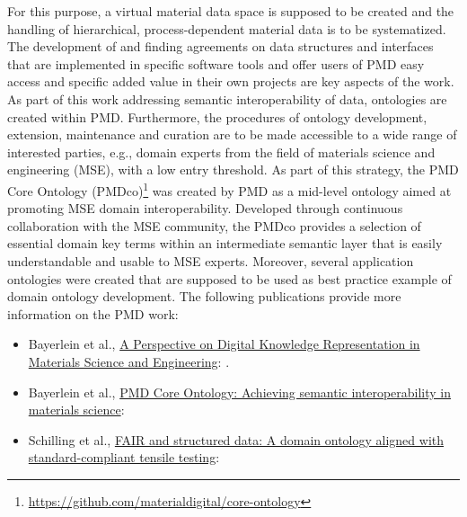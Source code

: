 For this purpose, a virtual material data space is supposed to be created and the handling of hierarchical, process-dependent material data is to be systematized. The development of and finding agreements on data structures and interfaces that are implemented in specific software tools and offer users of PMD easy access and specific added value in their own projects are key aspects of the work. As part of this work addressing semantic interoperability of data, ontologies are created within PMD. Furthermore, the procedures of ontology development, extension, maintenance and curation are to be made accessible to a wide range of interested parties, e.g., domain experts from the field of materials science and engineering (MSE), with a low entry threshold. 
As part of this strategy, the PMD Core Ontology (PMDco)\footnote{\url{https://github.com/materialdigital/core-ontology}} was created by PMD as a mid-level ontology aimed at promoting MSE domain interoperability. Developed through continuous collaboration with the MSE community, the PMDco provides a selection of essential domain key terms within an intermediate semantic layer that is easily understandable and usable to MSE experts. Moreover, several application ontologies were created that are supposed to be used as best practice example of domain ontology development. The following publications provide more information on the PMD work: 

\begin{itemize}
    \item Bayerlein et al., \href{https://doi.org/10.1002/adem.202101176}{A Perspective on Digital Knowledge Representation in Materials Science and Engineering}: \cite{BayerleinPerspective2022}.
    \item Bayerlein et al., \href{https://doi.org/10.1016/j.matdes.2023.112603}{PMD Core Ontology: Achieving semantic interoperability in materials science}: \cite{BayerleinPMDco2024}
    \item Schilling et al., \href{https://doi.org/10.1002/adem.202400138}{FAIR and structured data: A domain ontology aligned with standard-compliant tensile testing}: \cite{SchillingTTO2023}
\end{itemize}

\newpage
